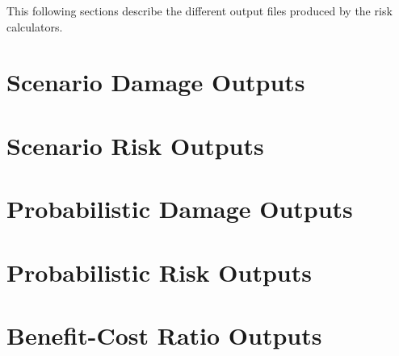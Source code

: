 This following sections describe the different output files produced by the risk
calculators.

\section{Scenario Damage Outputs}
\label{sec:outputs_scenario_damage}


\section{Scenario Risk Outputs}
\label{sec:outputs_scenario_risk}


\section{Probabilistic Damage Outputs}
\label{sec:outputs_probabilistic_damage}


\section{Probabilistic Risk Outputs}
\label{sec:outputs_probabilistic_risk}


\section{Benefit-Cost Ratio Outputs}
\label{sec:outputs_benefit_cost}

